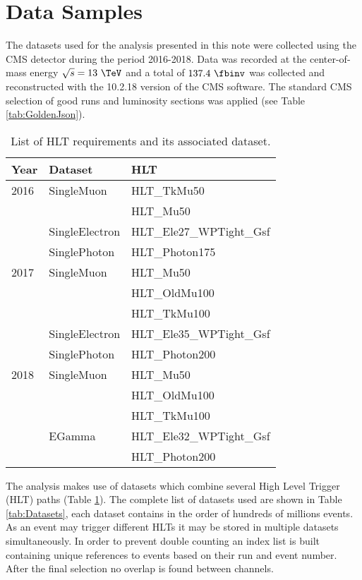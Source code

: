 \section{Data Samples}

The datasets used for the analysis presented in this note were collected using
the CMS detector during the period 2016-2018. Data was recorded at the
center-of-mass energy $\sqrt{s}=13~\TeV$ and a total of $137.4~\fbinv$ was collected
and reconstructed with the 10.2.18 version of the CMS software. The standard
CMS selection of good runs and luminosity sections was applied
(see Table \ref{tab:GoldenJson}).


\begin{table}[h]
\centering
\caption{List of HLT requirements and its associated dataset.}
\begin{tabular}{|l|l|l|}
\hline
Year & Dataset & HLT                \\ \hline
2016 & SingleMuon     & HLT\_TkMu50 \\
     &                & HLT\_Mu50   \\
     & SingleElectron & HLT\_Ele27\_WPTight\_Gsf  \\
     & SinglePhoton   & HLT\_Photon175            \\ \hline
2017 & SingleMuon     & HLT\_Mu50       \\
     &                & HLT\_OldMu100   \\
     &                & HLT\_TkMu100    \\
     & SingleElectron & HLT\_Ele35\_WPTight\_Gsf  \\
     & SinglePhoton   & HLT\_Photon200            \\ \hline
2018 & SingleMuon & HLT\_Mu50     \\
     &            & HLT\_OldMu100 \\
     &            & HLT\_TkMu100  \\
     & EGamma     & HLT\_Ele32\_WPTight\_Gsf \\
     &            & HLT\_Photon200           \\ \hline
\end{tabular}
\label{tab:HLTDatasets}
\end{table}

The analysis makes use of datasets which combine several High Level Trigger
(HLT) paths (Table \ref{tab:HLTDatasets}). The complete list of datasets
used are shown in Table \ref{tab:Datasets}, each
dataset contains in the order of hundreds of millions events. As an event
may trigger different HLTs it may be stored in multiple datasets simultaneously.
In order to prevent double counting an index list is built containing unique
references to events based on their run and event number. After the final selection
no overlap is found between channels.

